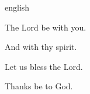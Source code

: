 \documentclass[12pt]{book}
\begin{document}
{english}
{\noindent \vv The Lord be with you.

\noindent \rr  And with thy spirit.}



\vv Let us bless the Lord.

\rr Thanks be to God.



\end{document}
